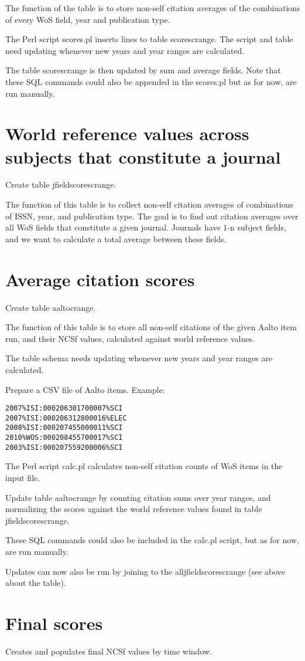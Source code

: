 \documentclass[report,nochapters]{aaltoseries}
\begin{document}
The function of the table is to store non-self citation averages of the combinations of every WoS field, year and publication type.

The Perl script scores.pl inserts lines to table scorescrange. The script and table need updating whenever new years and year ranges are calculated.

The table scorescrange is then updated by sum and average fields. Note that these SQL commands could also be appended in the scores.pl but as for now, are run manually.

\section{World reference values across subjects that constitute a journal}

Create table jfieldscorescrange.

The function of this table is to collect non-self citation averages of combinations of ISSN, year, and publication type. The goal is to find out citation averages over all WoS fields that constitute a given journal. Journals have 1-n subject fields, and we want to calculate a total average between these fields. 

\section{Average citation scores}

Create table aaltocrange.

The function of this table is to store all non-self citations of the given Aalto item run, and their NCSf values, calculated against world reference values.

The table schema needs updating whenever new years and year ranges are calculated.

Prepare a CSV file of Aalto items. Example:

\begin{verbatim}
2007%ISI:000206301700007%SCI
2007%ISI:000206312800016%ELEC
2008%ISI:000207455000011%SCI
2010%WOS:000208455700017%SCI
2003%ISI:000207559200006%SCI
\end{verbatim}

The Perl script calc.pl calculates non-self citation counts of WoS items in the input file.

Update table aaltocrange by counting citation sums over year ranges, and normalizing the scores against the world reference values found in table jfieldscorescrange.

These SQL commands could also be included in the calc.pl script, but as for now, are run manually.

Updates can now also be run by joining to the alljfieldscorescrange (see above about the table).

\section{Final scores}

Creates and populates final NCSf values by time window.
\end{document}
